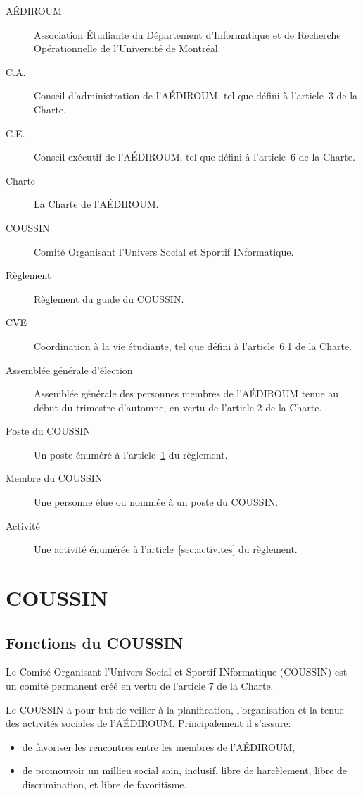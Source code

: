 \documentclass{aediroum}
\begin{document}
\begin{description}
    \item[AÉDIROUM] Association Étudiante du Département d'Informatique et de Recherche Opérationnelle de l'Université de Montréal.
    \item[C.A.] Conseil d’administration de l’AÉDIROUM, tel que défini à l’article~3 de la Charte.
    \item[C.E.] Conseil exécutif de l'AÉDIROUM, tel que défini à l'article~6 de la Charte.
    \item[Charte] La Charte de l'AÉDIROUM.
    \item[COUSSIN] Comité Organisant l'Univers Social et Sportif INformatique.
    \item[Règlement] Règlement du guide du COUSSIN.
    \item[CVE] Coordination à la vie étudiante, tel que défini à l'article~6.1 de la Charte.
    \item[Assemblée générale d'élection] Assemblée générale des personnes membres de l'AÉDIROUM tenue au début du trimestre d'automne, en vertu de l'article 2 de la Charte.
    \item[Poste du COUSSIN] Un poste énuméré à l'article~\ref{sec:structure-coussin} du règlement.
    \item[Membre du COUSSIN] Une personne élue ou nommée à un poste du COUSSIN.
    \item[Activité] Une activité énumérée à l'article~\ref{sec:activites} du règlement.
\end{description}

\section{COUSSIN}\label{sec:structure-coussin}

\subsection{Fonctions du COUSSIN}\label{sec:coussin}

Le Comité Organisant l'Univers Social et Sportif INformatique (COUSSIN) est un comité permanent créé en vertu de l'article 7 de la Charte.

Le COUSSIN a pour but de veiller à la planification, l'organisation et la tenue des activités sociales de l'AÉDIROUM. Principalement il s'assure:

\begin{itemize}
    \item de favoriser les rencontres entre les membres de l'AÉDIROUM,
    \item de promouvoir un millieu social sain, inclusif, libre de harcèlement, libre de discrimination, et libre de favoritisme.
\end{itemize}
\end{document}
